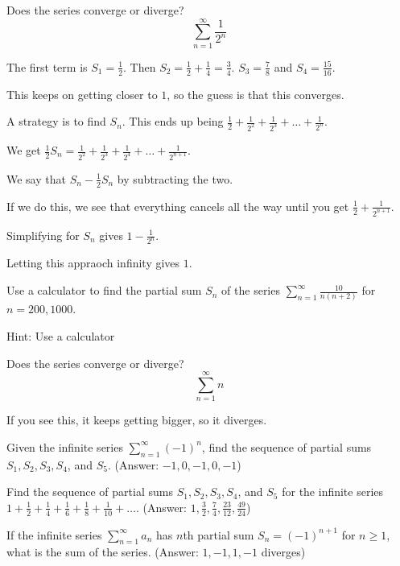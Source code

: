 \documentclass[../chem.tex]{subfiles}
\begin{document}
\begin{example}
    Does the series converge or diverge? 
    \[ \sum_{n=1}^{\infty} \frac{1}{2^n} \]

    The first term is $S_1=\frac{1}{2}$. Then $S_2 = \frac{1}{2}+\frac{1}{4} = \frac{3}{4}$. $S_3=\frac{7}{8}$ and $S_4 = \frac{15}{16}$.

    This keeps on getting closer to $1$, so the guess is that this converges.

    A strategy is to find $S_n$. This ends up being $\frac{1}{2}+\frac{1}{2^2}+\frac{1}{2^3}+\dots + \frac{1}{2^n}$.
    
    We get $\frac{1}{2}S_n=\frac{1}{2^2}+\frac{1}{2^3}+\frac{1}{2^4}+\dots + \frac{1}{2^{n+1}}$.

    We say that $S_n-\frac{1}{2}S_n$ by subtracting the two.

    If we do this, we see that everything cancels all the way until you get $\frac{1}{2}+\frac{1}{2^{n+1}}$.

    Simplifying for $S_n$ gives $1-\frac{1}{2^n}$.

    Letting this appraoch infinity gives $1$.
\end{example}

\begin{example}
    Use a calculator to find the partial sum $S_n$ of the series $\sum_{n=1}^{\infty} \frac{10}{n(n+2)}$ for $n=200,1000$.

    Hint: Use a calculator
\end{example}

\begin{example}
    Does the series converge or diverge? 
    \[ \sum_{n=1}^{\infty} n \]

    If you see this, it keeps getting bigger, so it diverges.
\end{example}

\ex Given the infinite series $\sum_{n=1}^{\infty} (-1)^n$, find the sequence of partial sums $S_1,S_2,S_3,S_4$, and $S_5$. (Answer: $-1,0,-1,0,-1$)

\ex Find the sequence of partial sums $S_1,S_2,S_3,S_4$, and $S_5$ for the infinite series $1+\frac{1}{2}+\frac{1}{4}+\frac{1}{6}+\frac{1}{8}+\frac{1}{10}+\dots$. (Answer: $1,\frac{3}{2},\frac{7}{4},\frac{23}{12},\frac{49}{24}$)

\ex If the infinite series $\sum_{n=1}^{\infty} a_n$ has $n$th partial sum $S_n=(-1)^{n+1}$ for $n\geq 1$, what is the sum of the series. (Answer: $1,-1,1,-1$ diverges)
\end{document}
